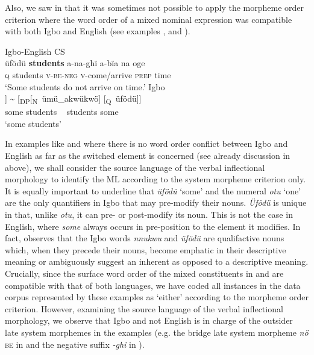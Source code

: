 \documentclass[output=paper]{langsci/langscibook}
\begin{document}
Also, we saw in  that it was sometimes not possible to apply the morpheme order criterion where the word order of a mixed nominal expression was compatible with both Igbo and English (see examples , and ).

\ea\label{ex:ihemere:22}
\ea Igbo-English CS\\
\gll üfödü  \textbf{students}  a-na-ghï   a-bïa    na   oge\\
     \textsc{q}     students  \textsc{v-be-neg}  \textsc{v}-come/arrive  \textsc{prep}  time   \\
\glt ‘Some students do not arrive on time.’
\ex
{Igbo} \\
\gll [\textsubscript{DP}[\textsubscript{Q}~üfödü]  [\textsubscript{N}~ümü\_akwükwö]] {\textasciitilde} [\textsubscript{DP}[\textsubscript{N}~ümü\_akwükwö]  [\textsubscript{Q}~üfödü]]\\
    {\hphantom{[\textsubscript{DP}[\textsubscript{Q}~}}some %
    {\hphantom{[\textsubscript{N}~}}students %
       ~ %
    {\hphantom{[\textsubscript{DP}[\textsubscript{N}~}}students %
    {\hphantom{[\textsubscript{Q}~}}some\\
\glt ‘some students’
\z
\z

In examples like  and  where there is no word order conflict between Igbo and English as far as the switched element is concerned (see already discussion in  above), we shall consider the source language of the verbal inflectional morphology to identify the ML according to the system morpheme criterion only. It is equally important to underline that \textit{üfödü} ‘some’ and the numeral \textit{otu} ‘one’ are the only quantifiers in Igbo that may pre-modify their nouns. \textit{Üfödü} is unique in that, unlike \textit{otu}, it can pre- or post-modify its noun. This is not the case in English, where \textit{some} always occurs in pre-position to the element it modifies. In fact, \citet[239]{MadukaDurunze1990} observes that the Igbo words \textit{nnukwu} and \textit{üfödü} are qualifactive nouns which, when they precede their nouns, become emphatic in their descriptive meaning or ambiguously suggest an inherent as opposed to a descriptive meaning. Crucially, since the surface word order of the mixed constituents in  and  are compatible with that of both languages, we have coded all instances in the data corpus represented by these examples as ‘either’ according to the morpheme order criterion. However, examining the source language of the verbal inflectional morphology, we observe that Igbo and not English is in charge of the outsider late system morphemes in the examples (e.g. the bridge late system morpheme \textit{nö} \textsc{be} in  and the negative suffix \textit{-ghi} in ). 
\end{document}
